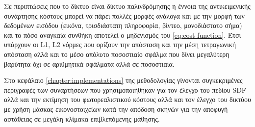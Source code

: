     Σε περιπτώσεις που το δίκτυο είναι δίκτυο παλινδρόμησης η έννοια της αντικειμενικής συνάρτησης κόστους μπορεί να πάρει πολλές μορφές ανάλογα και με την μορφή των δεδομένων εισόδου (εικόνα, τρισδιάστατη πληροφορία, βίντεο, μονοδιάστατο σήμα) και το πόσο αναγκαία συνθήκη αποτελεί ο μηδενισμός του \ref{eq:cost function}. Έτσι υπάρχουν οι L1, L2 νόρμες που ορίζουν την απόσταση και την μέση τετραγωνική απόσταση αλλά και το μέσο απόλυτο ποσοστιαίο σφάλμα  που δίνει μεγαλύτερη βαρύτητα όχι σε αριθμητικά σφάλματα αλλά σε ποσοστιαία. 

    Στο κεφάλαιο \ref{chapter:implementations} της μεθοδολογίας γίνονται συγκεκριμένες περιγραφές των συναρτήσεων που χρησιμοποιήθηκαν για τον έλεγχο του πεδίου SDF αλλά και την εκτίμηση του φωτορεαλιστικού κόστους αλλά και τον έλεγχο  του δικτύου με χρήση μάσκας εικονοστοιχείων κατά την απόδοση σκηνών για την αποφυγή αστάθειας σε μεγάλη κλίμακα επιβλεπόμενης μάθησης.
    \clearpage
